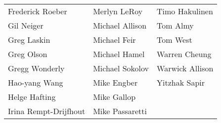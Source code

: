 \begin{center}
\begin{tabular}{lll}
Frederick Roeber & Merlyn LeRoy & Timo Hakulinen\\
Gil Neiger & Michael Allison & Tom Almy\\
Greg Laskin & Michael Feir & Tom West\\
Greg Olson & Michael Hamel & Warren Cheung\\
Gregg Wonderly & Michael Sokolov & Warwick Allison\\
Hao-yang Wang & Mike Engber & Yitzhak Sapir\\
Helge Hafting & Mike Gallop\\
Irina Rempt-Drijfhout & Mike Passaretti
\end{tabular}
\end{center}



